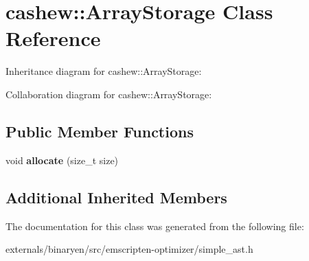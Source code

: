 \hypertarget{classcashew_1_1_array_storage}{}\section{cashew\+:\+:Array\+Storage Class Reference}
\label{classcashew_1_1_array_storage}


Inheritance diagram for cashew\+:\+:Array\+Storage\+:


Collaboration diagram for cashew\+:\+:Array\+Storage\+:
\subsection*{Public Member Functions}
\begin{DoxyCompactItemize}
\item 
\mbox{\label{classcashew_1_1_array_storage_a25665ee42e3c4a3894ebc389be23ffe9}} 
void {\bfseries allocate} (size\+\_\+t size)
\end{DoxyCompactItemize}
\subsection*{Additional Inherited Members}


The documentation for this class was generated from the following file\+:\begin{DoxyCompactItemize}
\item 
externals/binaryen/src/emscripten-\/optimizer/simple\+\_\+ast.\+h\end{DoxyCompactItemize}
